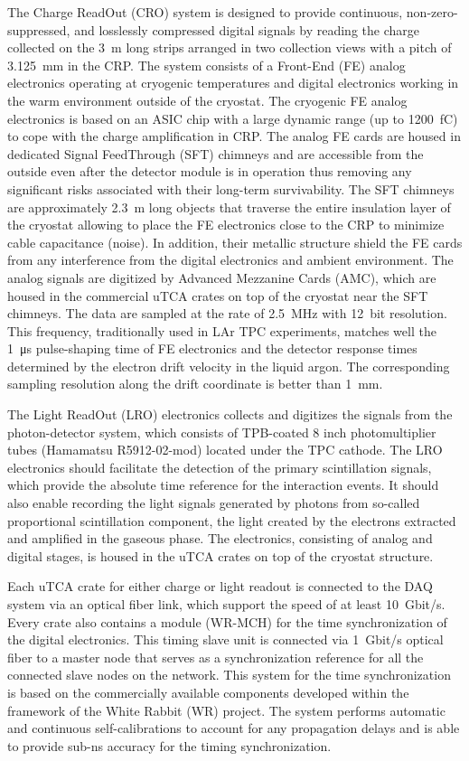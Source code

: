 The Charge ReadOut (CRO) system is designed to provide continuous, non-zero-suppressed, and losslessly compressed digital signals by reading the charge collected on the \SI{3}{m} long strips arranged in two collection views with a pitch of \SI{3.125}{mm} in the CRP. The system consists of a Front-End (FE) analog electronics operating at cryogenic temperatures and digital electronics working in the warm environment outside of the cryostat.  The cryogenic FE analog electronics is based on an ASIC chip with a large dynamic range (up to \SI{1200}{fC}) to cope with the charge amplification in CRP. The analog FE cards are housed in dedicated Signal FeedThrough (SFT) chimneys and are accessible from the outside even after the detector module is in operation thus removing any significant risks associated with their long-term survivability. The SFT chimneys are approximately \SI{2.3}{m} long objects that traverse the entire insulation layer of the cryostat allowing to place the FE electronics close to the CRP to minimize cable capacitance (noise).  In addition, their metallic structure shield the FE cards from any interference from the digital electronics and ambient environment. The analog signals are digitized by Advanced Mezzanine Cards (AMC), which are housed in the commercial uTCA crates on top of the cryostat near the SFT chimneys. The data are sampled at the rate of \SI{2.5}{MHz} with \SI{12}{bit} resolution.  This frequency, traditionally used in LAr TPC experiments, matches well the \SI{1}{\micro\second} pulse-shaping time of FE electronics and the detector response times determined by the electron drift velocity in the liquid argon. The corresponding sampling resolution along the drift coordinate is better than \SI{1}{\mm}. 

The Light ReadOut (LRO) electronics collects and digitizes the signals from the photon-detector system, which consists of TPB-coated \num{8} inch photomultiplier tubes (Hamamatsu R5912-02-mod) located under the TPC cathode. The LRO electronics should facilitate the detection of the primary scintillation signals, which provide the absolute time reference for the interaction events. It should also enable recording the light signals generated by photons from so-called proportional scintillation component, the light created by the electrons extracted and amplified in the gaseous phase. The electronics, consisting of analog and digital stages, is housed in the uTCA crates on top of the cryostat structure.

Each uTCA crate for either charge or light readout is connected to the DAQ system via an optical fiber link, which support the speed of at least \SI{10}{Gbit/s}. Every crate also contains a module (WR-MCH) for the time synchronization of the digital electronics. This timing slave unit is connected via \SI{1}{Gbit/s} optical fiber to a master node that serves as a synchronization reference for all the connected slave nodes on the network. This system for the time synchronization is based on the commercially available components developed within the framework of the White Rabbit (WR) project. The system performs automatic and continuous self-calibrations to account for any propagation delays and is able to provide sub-ns accuracy for the timing synchronization.



